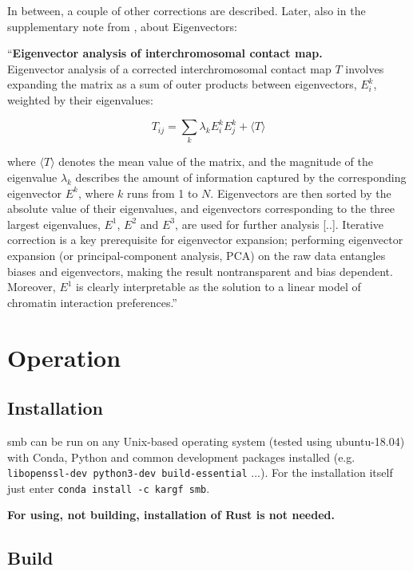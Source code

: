 \newpage

In between, a couple of other corrections are described. Later, also in the
supplementary note from \cite{imakaev2012iterative}, about Eigenvectors:

``\textbf{Eigenvector analysis of interchromosomal contact map.} \\
Eigenvector analysis of a corrected interchromosomal contact map $T$ involves
expanding the matrix as a sum of outer products between eigenvectors, $E^k_i$,
weighted by their eigenvalues:

$$ T_{ij} = \sum_k \lambda_k E^k_i E^k_j + \langle T \rangle$$

where $\langle T \rangle$ denotes the mean value of the matrix, and the
magnitude of the eigenvalue $\lambda_k$ describes the amount of information
captured by the corresponding eigenvector $E^k$, where $k$ runs from 1 to $N$.
Eigenvectors are then sorted by the absolute value of their eigenvalues, and
eigenvectors corresponding to the three largest eigenvalues, $E^1$, $E^2$ and
$E^3$, are used for further analysis [..]. Iterative correction is a key
prerequisite for eigenvector expansion; performing eigenvector expansion (or
principal-component analysis, PCA) on the raw data entangles biases and
eigenvectors, making the result nontransparent and bias dependent. Moreover,
$E^1$ is clearly interpretable as the solution to a linear model of chromatin
interaction preferences.''




\newpage
\section{Operation}\label{sec:operation}


\subsection{Installation}\label{sec:install}

smb can be run on any Unix-based operating system (tested using ubuntu-18.04)
with Conda, Python and common development packages installed (e.g.
\verb!libopenssl-dev python3-dev build-essential! ...). For the installation
itself just enter \verb|conda install -c kargf smb|.

\textbf{For using, not building, installation of Rust is not needed.}


\subsection{Build}\label{sec:build}

